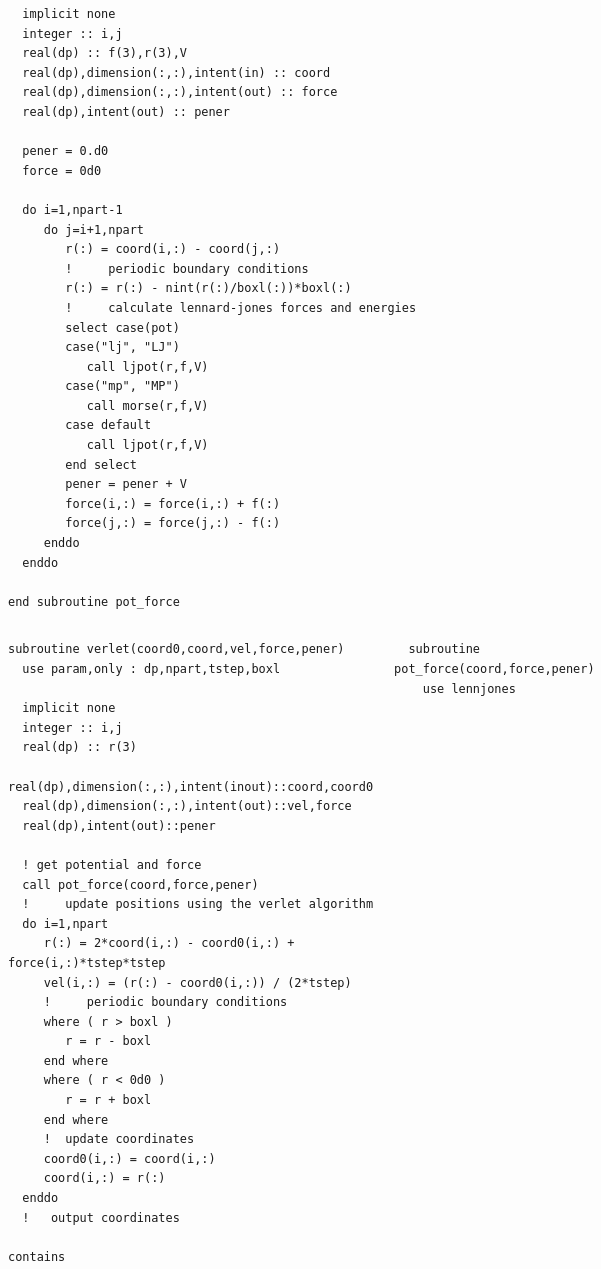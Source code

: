 \documentclass[slidestop,mathserif,compress,xcolor=svgnames]{beamer}
\newenvironment{eblock}[0]
{
\begin{beamerboxesrounded}[upper=uppercol2,lower=lowercol2,shadow=true]}
{\end{beamerboxesrounded}}
\newenvironment{eeblock}[0]
{
\begin{beamerboxesrounded}[upper=uppercol4,lower=lowercol4,shadow=true]}
{\end{beamerboxesrounded}}
\begin{document}
\begin{frame}
{\begin{columns}
\begin{eblock}{}
\begin{verbatim}
  implicit none
  integer :: i,j
  real(dp) :: f(3),r(3),V
  real(dp),dimension(:,:),intent(in) :: coord
  real(dp),dimension(:,:),intent(out) :: force
  real(dp),intent(out) :: pener
  
  pener = 0.d0
  force = 0d0
  
  do i=1,npart-1
     do j=i+1,npart
        r(:) = coord(i,:) - coord(j,:)
        !     periodic boundary conditions
        r(:) = r(:) - nint(r(:)/boxl(:))*boxl(:)
        !     calculate lennard-jones forces and energies
        select case(pot)
        case("lj", "LJ")
           call ljpot(r,f,V)
        case("mp", "MP")
           call morse(r,f,V)
        case default
           call ljpot(r,f,V)
        end select
        pener = pener + V
        force(i,:) = force(i,:) + f(:)
        force(j,:) = force(j,:) - f(:)
     enddo
  enddo

end subroutine pot_force
        \end{verbatim}
      \end{eblock}
    \end{columns}
  }
  \framebreak
  {\fontsize{4}{5}
    \begin{columns}
      \column{5.5cm}
      \vspace{-0.4cm}
      \begin{eeblock}{}
        \begin{verbatim}
subroutine verlet(coord0,coord,vel,force,pener)
  use param,only : dp,npart,tstep,boxl
  
  implicit none
  integer :: i,j
  real(dp) :: r(3)
  real(dp),dimension(:,:),intent(inout)::coord,coord0
  real(dp),dimension(:,:),intent(out)::vel,force
  real(dp),intent(out)::pener
  
  ! get potential and force
  call pot_force(coord,force,pener)
  !     update positions using the verlet algorithm
  do i=1,npart
     r(:) = 2*coord(i,:) - coord0(i,:) + force(i,:)*tstep*tstep
     vel(i,:) = (r(:) - coord0(i,:)) / (2*tstep)
     !     periodic boundary conditions
     where ( r > boxl ) 
        r = r - boxl
     end where
     where ( r < 0d0 )
        r = r + boxl
     end where
     !  update coordinates
     coord0(i,:) = coord(i,:)
     coord(i,:) = r(:)
  enddo
  !   output coordinates
  
contains
  
        \end{verbatim}
      \end{eeblock}
      \column{5.5cm}
      \vspace{-0.4cm}
      \begin{eeblock}{}
        \begin{verbatim}
  subroutine pot_force(coord,force,pener)
    use lennjones
    

\end{verbatim}
\end{eeblock}
\end{columns}}
\end{frame}
\end{document}
